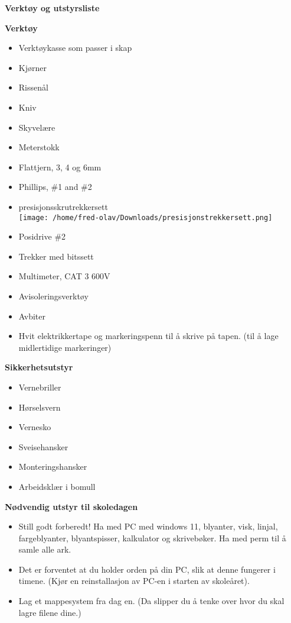 


\centerline{\bf Verktøy og utstyrsliste }

\vskip 10pt


\noindent
{\bf Verktøy}
\begin{itemize}[itemsep=1mm, parsep=0pt]
	\item Verktøykasse som passer i skap 
	\item Kjørner
	\item Rissenål
	\item Kniv
	\item Skyvelære
	\item Meterstokk
	\item Flattjern, 3, 4 og 6mm
	\item Phillips, \#1 and \#2
	\item presisjonsskrutrekkersett\\
       \texttt{[image: /home/fred-olav/Downloads/presisjonstrekkersett.png]}
	\item Posidrive \#2
	\item Trekker med bitssett
	\item Multimeter, CAT 3 600V 
	\item Avisoleringsverktøy
	\item Avbiter
	\item Hvit elektrikkertape og markeringspenn til å skrive på tapen. (til å lage midlertidige markeringer)
\medskip
\end{itemize}
\vskip 10pt

\noindent
{\bf Sikkerhetsutstyr}
\begin{itemize}[itemsep=1mm, parsep=0pt]
	\item Vernebriller
	\item Hørselsvern
	\item Vernesko
	\item Sveisehansker
	\item Monteringshansker
	\item Arbeidsklær i bomull
\medskip
\end{itemize}
\vskip 10pt

\noindent
{\bf Nødvendig utstyr til skoledagen}
\begin{itemize}[itemsep=1mm, parsep=0pt]
	
	\item Still godt forberedt! Ha med PC med windows 11, blyanter, visk, linjal, fargeblyanter, blyantspisser, kalkulator og skrivebøker. Ha med perm til å samle alle ark.
	\item Det er forventet at du holder orden på din PC, slik at denne fungerer i timene. (Kjør en reinstallasjon av PC-en i starten av skoleåret). 
	\item Lag et mappesystem fra dag en. (Da slipper du å tenke over hvor du skal lagre filene dine.)
\medskip
\end{itemize}
\vskip 10pt



\vfil

\eject


